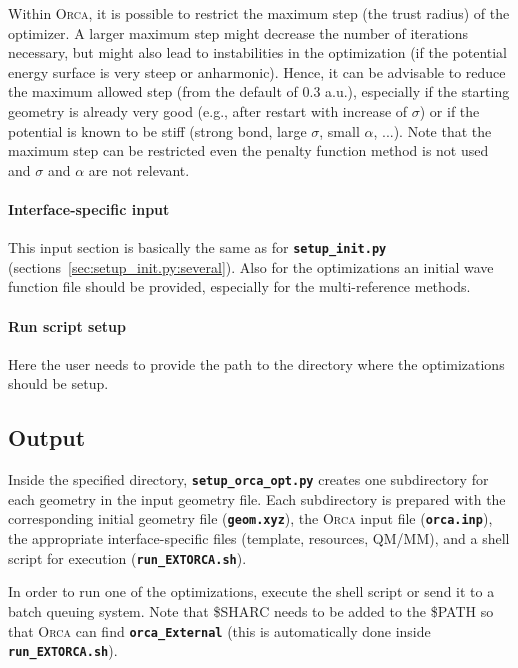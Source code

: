 \documentclass[a4paper,10pt,DIV=15,openany]{scrbook}
\newcommand{\ttt}[1]{\textbf{\texttt{#1}}}
\begin{document}
Within \textsc{Orca}, it is possible to restrict the maximum step (the trust radius) of the optimizer. 
A larger maximum step might decrease the number of iterations necessary, but might also lead to instabilities in the optimization (if the potential energy surface is very steep or anharmonic).
Hence, it can be advisable to reduce the maximum allowed step (from the default of 0.3 a.u.), especially if the starting geometry is already very good (e.g., after restart with increase of $\sigma$) or if the potential is known to be stiff (strong bond, large $\sigma$, small $\alpha$, ...).
Note that the maximum step can be restricted even the penalty function method is not used and $\sigma$ and $\alpha$ are not relevant.

\paragraph{Interface-specific input}

This input section is basically the same as for \ttt{setup\_init.py} (sections~\ref{sec:setup_init.py:several}). Also for the optimizations an initial wave function file should be provided, especially for the multi-reference methods.

\paragraph{Run script setup}

Here the user needs to provide the path to the directory where the optimizations should be setup.


\subsection{Output}

Inside the specified directory, \ttt{setup\_orca\_opt.py} creates one subdirectory for each geometry in the input geometry file.
Each subdirectory is prepared with the corresponding initial geometry file (\ttt{geom.xyz}), the \textsc{Orca} input file (\ttt{orca.inp}), the appropriate interface-specific files (template, resources, QM/MM), and a shell script for execution (\ttt{run\_EXTORCA.sh}).

In order to run one of the optimizations, execute the shell script or send it to a batch queuing system.
Note that \$SHARC needs to be added to the \$PATH so that \textsc{Orca} can find \ttt{orca\_External} (this is automatically done inside \ttt{run\_EXTORCA.sh}).
\end{document}
